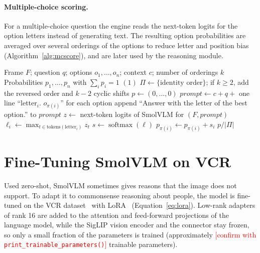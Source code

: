 \documentclass[12pt,a4paper,oneside]{report}
\newcommand{\fillin}[1]{\textcolor{red}{[#1]}}
\newcommand{\code}[1]{\texttt{#1}}
\begin{document}
\paragraph{Multiple-choice scoring.} For a multiple-choice question the engine
reads the next-token logits for the option letters instead of generating text.
The resulting option probabilities are averaged over several orderings of the
options to reduce letter and position bias (Algorithm~\ref{alg:mcscore}), and
are later used by the reasoning module.

\begin{algorithm}[htbp]
\caption{Debiased multiple-choice scoring}
\label{alg:mcscore}
\begin{algorithmic}[1]
\Require Frame $F$; question $q$; options $o_1,\dots,o_n$; context $c$; number of orderings $k$
\Ensure Probabilities $p_1,\dots,p_n$ with $\sum_i p_i = 1$
  \State \Return $(1)$
\EndIf
\State $\Pi \gets \{\text{identity order}\}$; if $k \geq 2$, add the reversed order and $k-2$ cyclic shifts
\State $p \gets (0,\dots,0)$
  \State $\mathit{prompt} \gets c + q +$ one line ``letter$_i$. $o_{\pi(i)}$'' for each option
  \State append ``Answer with the letter of the best option.'' to $\mathit{prompt}$
  \State $z \gets$ next-token logits of SmolVLM for $(F, \mathit{prompt})$
    \State $\ell_i \gets \max_{t \in \text{tokens}(\text{letter}_i)} z_t$
  \EndFor
  \State $s \gets \operatorname{softmax}(\ell)$
    \State $p_{\pi(i)} \gets p_{\pi(i)} + s_i$ 
  \EndFor
\EndFor
\State \Return $p / |\Pi|$
\end{algorithmic}
\end{algorithm}

\section{Fine-Tuning SmolVLM on VCR}
\label{sec:finetune}

Used zero-shot, SmolVLM sometimes gives reasons that the image does not support.
To adapt it to commonsense reasoning about people, the model is fine-tuned on
the VCR dataset~\cite{zellers2019vcr} with LoRA~\cite{hu2022lora}
(Equation~\ref{eq:lora}). Low-rank adapters of rank 16 are added to the
attention and feed-forward projections of the language model, while the SigLIP
vision encoder and the connector stay frozen, so only a small fraction of the
parameters is trained (approximately \fillin{confirm with
\code{print\_trainable\_parameters()}} trainable parameters).
\end{document}
